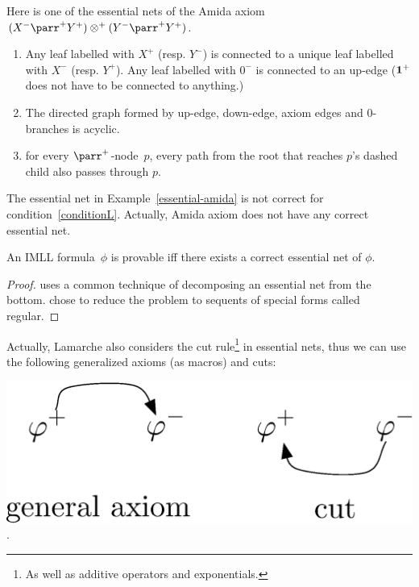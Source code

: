  \begin{example} \label{essential-amida}
  Here is one of the essential nets of
  the Amida axiom $(X^-\parr^+Y^+)\otimes^+(Y^-\parr^+ Y^+)$.
 \end{example}

  \begin{definition}
\begin{enumerate}
 \item Any leaf labelled with $X^+$ (resp. $Y^-$) is connected to a
       unique leaf labelled with $X^-$ (resp. $Y^+$).
       Any leaf labelled with $0^-$ is connected to an up-edge
       ($\mathbf{1}^+$ does not have to be connected to anything.)
 \item The directed graph formed by up-edge, down-edge, axiom edges and
       0-branches is acyclic.
 \item \label{conditionL}
       for every $\parr^+$-node~$p$, every path from the root that reaches
       $p$'s dashed child also passes through $p$.
\end{enumerate}
  \end{definition}
The essential net in Example~\ref{essential-amida} is not correct for
condition~\ref{conditionL}.  Actually, Amida axiom does not have
any correct essential net.

 \begin{theorem}
  An IMLL formula~$\phi$ is provable iff there exists a correct essential net
  of $\phi$.
 \end{theorem}
 \begin{proof}
  \citet{lamarche2008} uses a common technique of decomposing an
  essential net from the bottom.
  \citet{murawski2003} chose to reduce the problem to sequents of special forms
  called regular.
 \end{proof}

 Actually, Lamarche also considers the cut rule\footnote{As well as
 additive operators and exponentials.} in essential nets, thus
 we can use the following generalized axioms (as macros) and cuts:
 \begin{center}
  \includegraphics[scale=0.4]{general-axiom-cut.eps}\enspace.
 \end{center}

